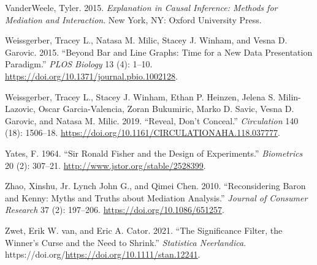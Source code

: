 \documentclass[
  11pt,
  letterpaper,
]{scrbook}
\newlength{\cslhangindent}
\newlength{\cslentryspacingunit} %
\newenvironment{CSLReferences}[2] %
 {%
  \setlength{\parindent}{0pt}
  \ifodd #1
  \let\oldpar\par
  \def\par{\hangindent=\cslhangindent\oldpar}
  \fi
  \setlength{\parskip}{#2\cslentryspacingunit}
 }%
 {}
\theoremstyle{definition}
\theoremstyle{remark}
\begin{document}
\begin{CSLReferences}{1}{0}
\leavevmode{}%
VanderWeele, Tyler. 2015. \emph{Explanation in Causal Inference: Methods
for Mediation and Interaction}. New York, NY: Oxford University Press.

\leavevmode{}%
Weissgerber, Tracey L., Natasa M. Milic, Stacey J. Winham, and Vesna D.
Garovic. 2015. {``Beyond Bar and Line Graphs: Time for a New Data
Presentation Paradigm.''} \emph{PLOS Biology} 13 (4): 1--10.
\url{https://doi.org/10.1371/journal.pbio.1002128}.

\leavevmode{}%
Weissgerber, Tracey L., Stacey J. Winham, Ethan P. Heinzen, Jelena S.
Milin-Lazovic, Oscar Garcia-Valencia, Zoran Bukumiric, Marko D. Savic,
Vesna D. Garovic, and Natasa M. Milic. 2019. {``Reveal, Don't
Conceal.''} \emph{Circulation} 140 (18): 1506--18.
\url{https://doi.org/10.1161/CIRCULATIONAHA.118.037777}.

\leavevmode{}%
Yates, F. 1964. {``Sir {R}onald {F}isher and the Design of
Experiments.''} \emph{Biometrics} 20 (2): 307--21.
\url{http://www.jstor.org/stable/2528399}.

\leavevmode{}%
Zhao, Xinshu, Jr. Lynch John G., and Qimei Chen. 2010. {``Reconsidering
{B}aron and {K}enny: Myths and Truths about Mediation Analysis.''}
\emph{Journal of Consumer Research} 37 (2): 197--206.
\url{https://doi.org/10.1086/651257}.

\leavevmode{}%
Zwet, Erik W. van, and Eric A. Cator. 2021. {``The Significance Filter,
the Winner's Curse and the Need to Shrink.''} \emph{Statistica
Neerlandica}. https://doi.org/\url{https://doi.org/10.1111/stan.12241}.

\end{CSLReferences}


\backmatter
\end{document}
